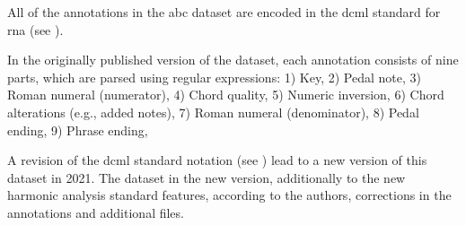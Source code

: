 
All of the annotations in the \gls{abc} dataset are encoded
in the \gls{dcml} standard for \gls{rna} (see
).


In the originally published version of the dataset, each
annotation consists of nine parts, which are parsed using
regular expressions: 1) Key, 2) Pedal note, 3) Roman numeral
(numerator), 4) Chord quality, 5) Numeric inversion, 6)
Chord alterations (e.g., added notes), 7) Roman numeral
(denominator), 8) Pedal ending, 9) Phrase ending,


A revision of the \gls{dcml} standard notation (see
) lead to a new version of this
dataset in 2021. The dataset in the new version,
additionally to the new harmonic analysis standard features,
according to the authors, corrections in the annotations and
additional files.
